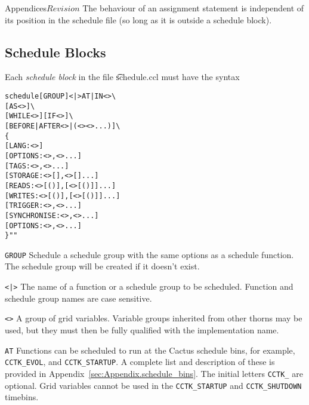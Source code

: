 \begin{cactuspart}{Appendices}{}{$Revision$}
The behaviour of an assignment statement is independent of its
position in the schedule file (so long as it is outside a schedule
block). 

\subsection{Schedule Blocks}

Each \textit{schedule block} in the file {\t schedule.ccl} must have the syntax

\begin{alltt}
schedule [GROUP] <|> AT|IN <> \verb|\|
     [AS <>] \verb|\|
     [WHILE <>] [IF <>] \verb|\|
     [BEFORE|AFTER <>|(<> <> ...)] \verb|\|
\{
  [LANG: <>]
  [OPTIONS:       <>,<>...]
  [TAGS:          <>,<>...]
  [STORAGE:       <>[],<>[]...]
  [READS:         <>[()],[<>[()]]...]
  [WRITES:        <>[()],[<>[()]]...]
  [TRIGGER:       <>,<>...]
  [SYNCHRONISE:   <>,<>...]
  [OPTIONS:       <>,<>...]
\} ""
\end{alltt}

\begin{Lentry}
  \item[{\tt GROUP}] Schedule a schedule group with the same options
  as a schedule function.  The schedule group will be created if it doesn't exist.

  \item[{\tt <\var{function name}|\var{group name}>}] The name of a function or a
  schedule group to be scheduled.  Function and schedule group names
  are case sensitive.

  \item[{\tt <\var{group}>}] A group of grid variables. Variable groups
  inherited from other thorns may be used, but they must then be fully
  qualified with the implementation name.

  \item[{\tt AT}] Functions can be scheduled to run at the Cactus
  schedule bins, for example, {\tt CCTK\_EVOL}, and {\tt CCTK\_STARTUP}. A
  complete list and description of these is provided in
  Appendix~\ref{sec:Appendix.schedule_bins}.  The initial letters
  {\tt CCTK\_} are optional. Grid variables cannot be used in the
  {\tt CCTK\_STARTUP} and {\tt CCTK\_SHUTDOWN} timebins.


\end{Lentry}
\end{cactuspart}
